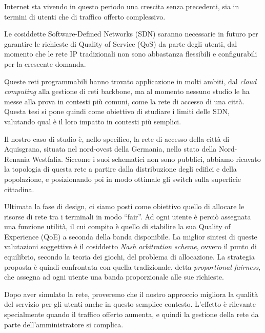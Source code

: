 
Internet sta vivendo in questo periodo una crescita senza precedenti, sia in
termini di utenti che di traffico offerto complessivo.

Le cosiddette Software-Defined Networks (SDN) saranno necessarie in futuro per
garantire le richieste di Quality of Service (QoS) da parte degli utenti, dal
momento che le rete IP tradizionali non sono abbastanza flessibili e
configurabili per la crescente domanda.

Queste reti programmabili hanno trovato applicazione in molti ambiti, dal
\emph{cloud computing} alla gestione di reti backbone, ma al momento nessuno
studio le ha messe alla prova in contesti più comuni, come la rete di accesso di
una città. Questa tesi si pone quindi come obiettivo di studiare i limiti delle
SDN, valutando qual è il loro impatto in contesti più semplici.

\smallskip

Il nostro caso di studio è, nello specifico, la rete di accesso della città di
Aquisgrana, situata nel nord-ovest della Germania, nello stato della
Nord-Renania Westfalia. %
%
Siccome i suoi schematici non sono pubblici, abbiamo ricavato la topologia di
questa rete a partire dalla distribuzione degli edifici e della popolazione, e
posizionando poi in modo ottimale gli switch sulla superficie cittadina.

Ultimata la fase di design, ci siamo posti come obiettivo quello di allocare le
risorse di rete tra i terminali in modo ``fair''.
%
Ad ogni utente è perciò assegnata una funzione utilità, il cui compito è quello
di stabilire la sua Quality of Experience (QoE) a seconda della banda
disponibile.
%
La miglior sintesi di queste valutazioni soggettive è il cosiddetto \emph{Nash
arbitration scheme}, ovvero il punto di equilibrio, secondo la teoria dei
giochi, del problema di allocazione.
%
La strategia proposta è quindi confrontata con quella tradizionale, detta
\emph{proportional fairness}, che assegna ad ogni utente una banda proporzionale
alle sue richieste.

Dopo aver simulato la rete, proveremo che il nostro approccio migliora la
qualità del servizio per gli utenti anche in questo semplice
contesto. L'effetto è rilevante specialmente quando il traffico offerto aumenta,
e quindi la gestione della rete da parte dell'amministratore si complica.

